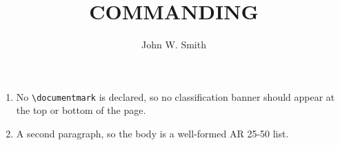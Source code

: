 \documentclass{../armymemo}
\author{John W. Smith}\rank{CPT}\branch{CY}
\title{COMMANDING}
\begin{document}
\begin{enumerate}
	\item No \verb|\documentmark| is declared, so no classification banner should
	      appear at the top or bottom of the page.
	\item A second paragraph, so the body is a well-formed AR 25-50 list.
\end{enumerate}
\end{document}
